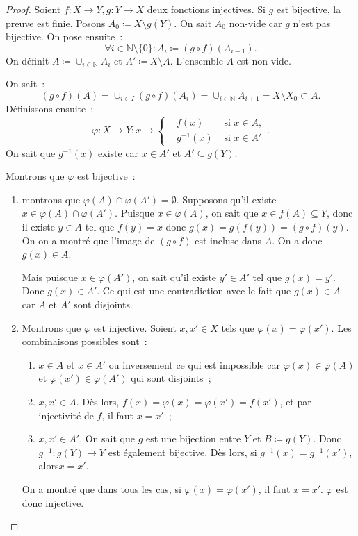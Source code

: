 \documentclass{article}
\newcommand{\N}{\mathbb N}
\theoremstyle{definition}
\theoremstyle{remark}
\begin{document}
		\begin{proof} Soient $f : X \to Y, g : Y \to X$ deux fonctions injectives. Si $g$ est bijective, la preuve est finie. Posons $A_0 \coloneqq X \setminus g(Y)$.
		On sait $A_0$ non-vide car $g$ n'est pas bijective. On pose ensuite~: \[\forall i \in \N \setminus \{0\} : A_i \coloneqq (g \circ f)(A_{i-1}).\]
		On définit $A \coloneqq \cup_{i\in\N}A_i$ et $A' \coloneqq X \setminus A$. L'ensemble $A$ est non-vide.

		On sait~: \[(g \circ f)(A) = \cup_{i \in I}(g \circ f)(A_i) = \cup_{i\in\N}A_{i+1} = X \setminus X_0\subset A.\]
		Définissons ensuite~: \[\varphi : X \to Y : x \mapsto \left\{\begin{aligned}&f(x) &\text{ si } x \in A, \\&g^{-1}(x) &\text{ si $x \in A'$}\end{aligned}\right..\]
		On sait que $g^{-1}(x)$ existe car $x \in A'$ et $A' \subseteq g(Y)$.

		Montrons que $\varphi$ est bijective~:
		\begin{enumerate}
			\item montrons que $\varphi(A) \cap \varphi(A') = \emptyset$. Supposons qu'il existe $x \in \varphi(A) \cap \varphi(A')$. Puisque $x \in \varphi(A)$,
			      on sait que $x \in f(A) \subseteq Y$, donc il existe $y \in A$ tel que $f(y) = x$ donc $g(x) = g(f(y)) = (g \circ f)(y)$. On on a montré que l'image
				  de $(g \circ f)$ est incluse dans $A$. On a donc $g(x) \in A$.

			      Mais puisque $x \in \varphi(A')$, on sait qu'il existe $y' \in A'$ tel que $g(x) = y'$. Donc $g(x) \in A'$. Ce qui est une contradiction avec le fait
				  que $g(x) \in A$ car $A$ et $A'$ sont disjoints.

			\item Montrons que $\varphi$ est injective. Soient $x, x' \in X$ tels que $\varphi(x) = \varphi(x')$. Les combinaisons possibles sont~:
			\begin{enumerate}
				\item $x \in A$ et $x \in A'$ ou inversement ce qui est impossible car $\varphi(x) \in \varphi(A)$ et $\varphi(x') \in \varphi(A')$ qui sont disjoints~;
				\item $x, x' \in A$. Dès lors, $f(x) = \varphi(x) = \varphi(x') = f(x')$, et par injectivité de $f$, il faut $x=x'$~;
				\item $x, x' \in A'$. On sait que $g$ est une bijection entre $Y$ et $B \coloneqq g(Y)$. Donc $g^{-1} : g(Y) \to Y$ est également bijective. Dès lors,
				si $g^{-1}(x) = g^{-1}(x')$, alors$x = x'$.
			\end{enumerate}
			On a montré que dans tous les cas, si $\varphi(x) = \varphi(x')$, il faut $x=x'$. $\varphi$ est donc injective.


\end{enumerate}
\end{proof}
\end{document}
